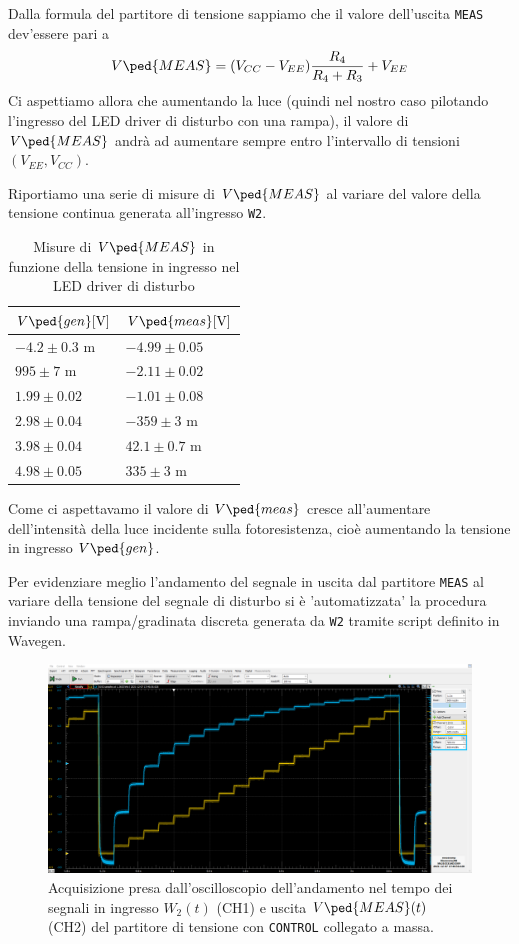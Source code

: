 \documentclass[10pt, a4paper, italian]{article}
\begin{document}
Dalla formula del partitore di tensione sappiamo che il valore dell'uscita
\verb+MEAS+ dev'essere pari a
\begin{equation}
V\ped{MEAS} = (V_{CC} -  V_{EE})\frac{R_4}{R_4 + R_3} + V_{EE}
\end{equation}
Ci aspettiamo allora che aumentando la luce (quindi nel nostro caso pilotando
l'ingresso del LED driver di disturbo con una rampa), il valore di
$V\ped{MEAS}$ andrà ad aumentare sempre entro l'intervallo di tensioni
$(V_{EE}, V_{CC})$.

Riportiamo una serie di misure di $V\ped{MEAS}$ al variare del valore della
tensione continua generata all'ingresso \verb+W2+.
\begin{table}[htbp]
\centering
\begin{tabular}{@{}ll@{}}
\toprule
$V\ped{gen} [\si{\V}]$ & $V\ped{meas} [\si{\V}]$\\
\midrule
$-4.2 \pm 0.3$ m 	& $ -4.99 \pm 0.05$	\\
$995 \pm 7$ m 	& $ -2.11 \pm 0.02 $	\\
$1.99 \pm 0.02$ 	& $ -1.01 \pm 0.08 $\\
$2.98 \pm 0.04$ 	& $ -359 \pm 3 $ m\\
$3.98 \pm 0.04$ 	& $ 42.1 \pm 0.7 $ m\\
$4.98 \pm 0.05$ 	& $ 335 \pm 3$ m\\
\bottomrule
\end{tabular}
\caption{Misure di $V\ped{MEAS}$ in funzione della tensione in ingresso nel
LED driver di disturbo}
\end{table}
Come ci aspettavamo il valore di $V\ped{meas}$ cresce all'aumentare
dell'intensità della luce incidente sulla fotoresistenza, cioè aumentando la
tensione in ingresso $V\ped{gen}$.

Per evidenziare meglio l'andamento del segnale in uscita dal partitore
\verb+MEAS+ al variare della tensione del segnale di disturbo si è
'automatizzata' la procedura inviando una rampa/gradinata discreta generata
da \verb+W2+ tramite script definito in Wavegen.
\begin{figure}[htbp]
    \centering
	\includegraphics[width=\textwidth]{measgrad}
    \caption{Acquisizione presa dall'oscilloscopio dell'andamento nel tempo dei
	segnali in ingresso $W_2 (t)$ (CH1) e uscita $V\ped{MEAS} (t)$ (CH2)
	del partitore di tensione con \texttt{CONTROL} collegato a massa.
    \label{fig: errmeas}}
\end{figure}
\end{document}
